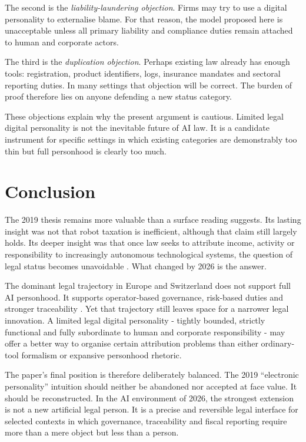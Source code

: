 \documentclass[11pt]{article}
\begin{document}
The second is the \emph{liability-laundering objection}. Firms may try to use a digital personality to externalise blame. For that reason, the model proposed here is unacceptable unless all primary liability and compliance duties remain attached to human and corporate actors.

The third is the \emph{duplication objection}. Perhaps existing law already has enough tools: registration, product identifiers, logs, insurance mandates and sectoral reporting duties. In many settings that objection will be correct. The burden of proof therefore lies on anyone defending a new status category.

These objections explain why the present argument is cautious. Limited legal digital personality is not the inevitable future of AI law. It is a candidate instrument for specific settings in which existing categories are demonstrably too thin but full personhood is clearly too much.

\section{Conclusion}
The 2019 thesis remains more valuable than a surface reading suggests. Its lasting insight was not that robot taxation is inefficient, although that claim still largely holds. Its deeper insight was that once law seeks to attribute income, activity or responsibility to increasingly autonomous technological systems, the question of legal status becomes unavoidable \citep{graz2019}. What changed by 2026 is the answer.

The dominant legal trajectory in Europe and Switzerland does not support full AI personhood. It supports operator-based governance, risk-based duties and stronger traceability \citep{eu2024aiact,ofcom2025swissai,coe2024framework}. Yet that trajectory still leaves space for a narrower legal innovation. A limited legal digital personality - tightly bounded, strictly functional and fully subordinate to human and corporate responsibility - may offer a better way to organise certain attribution problems than either ordinary-tool formalism or expansive personhood rhetoric.

The paper's final position is therefore deliberately balanced. The 2019 ``electronic personality'' intuition should neither be abandoned nor accepted at face value. It should be reconstructed. In the AI environment of 2026, the strongest extension is not a new artificial legal person. It is a precise and reversible legal interface for selected contexts in which governance, traceability and fiscal reporting require more than a mere object but less than a person.



\end{document}
